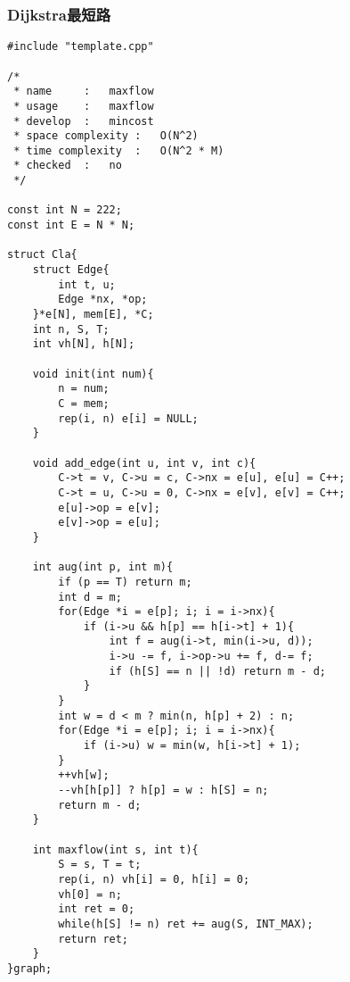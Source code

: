 \subsubsection{Dijkstra最短路}
\begin{verbatim}
#include "template.cpp" 

/*
 * name 	: 	maxflow
 * usage 	:	maxflow
 * develop	:	mincost
 * space complexity	:	O(N^2)
 * time complexity	:	O(N^2 * M)
 * checked	:	no
 */

const int N = 222;
const int E = N * N;

struct Cla{
	struct Edge{
		int t, u;
		Edge *nx, *op;
	}*e[N], mem[E], *C;
	int n, S, T;
	int vh[N], h[N];

	void init(int num){
		n = num;
		C = mem;
		rep(i, n) e[i] = NULL;
	}

	void add_edge(int u, int v, int c){
		C->t = v, C->u = c, C->nx = e[u], e[u] = C++;
		C->t = u, C->u = 0, C->nx = e[v], e[v] = C++;
		e[u]->op = e[v];
		e[v]->op = e[u];
	}

	int aug(int p, int m){
		if (p == T) return m;
		int d = m;
		for(Edge *i = e[p]; i; i = i->nx){
			if (i->u && h[p] == h[i->t] + 1){
				int f = aug(i->t, min(i->u, d));
				i->u -= f, i->op->u += f, d-= f;
				if (h[S] == n || !d) return m - d;
			}
		}
		int w = d < m ? min(n, h[p] + 2) : n;
		for(Edge *i = e[p]; i; i = i->nx){
			if (i->u) w = min(w, h[i->t] + 1);
		}
		++vh[w];
		--vh[h[p]] ? h[p] = w : h[S] = n;
		return m - d;
	}

	int maxflow(int s, int t){
		S = s, T = t;
		rep(i, n) vh[i] = 0, h[i] = 0;
		vh[0] = n;
		int ret = 0;
		while(h[S] != n) ret += aug(S, INT_MAX);
		return ret;
	}
}graph;
\end{verbatim}
